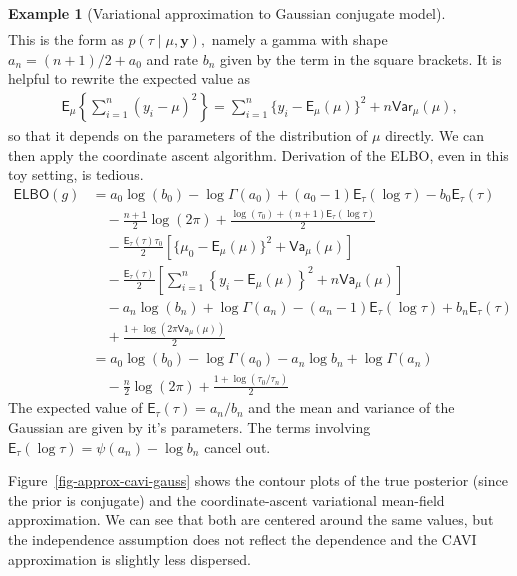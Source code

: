 \documentclass[
  11pt,
  letterpaper,
]{scrbook}
\theoremstyle{definition}
\newtheorem{example}{Example}[chapter]
\theoremstyle{plain}
\theoremstyle{plain}
\theoremstyle{plain}
\theoremstyle{definition}
\theoremstyle{definition}
\theoremstyle{plain}
\theoremstyle{plain}
\theoremstyle{remark}
\begin{document}
\begin{example}[Variational approximation to Gaussian conjugate
model]
\begin{align*}
\end{align*} This is the form as \(p(\tau \mid \mu, \boldsymbol{y}),\)
namely a gamma with shape \(a_n =(n+1)/2 + a_0\) and rate \(b_n\) given
by the term in the square brackets. It is helpful to rewrite the
expected value as \begin{align*}
 \mathsf{E}_{\mu}\left\{\sum_{i=1}^n (y_i-\mu)^2\right\} = \sum_{i=1}^n \{y_i - \mathsf{E}_{\mu}(\mu)\}^2 + n \mathsf{Var}_{\mu}(\mu),
\end{align*} so that it depends on the parameters of the distribution of
\(\mu\) directly. We can then apply the coordinate ascent algorithm.
Derivation of the ELBO, even in this toy setting, is tedious.
\begin{align*}
\mathsf{ELBO}(g) & = a_0\log(b_0)-\log \Gamma(a_0) +(a_0-1)\mathsf{E}_{\tau}(\log \tau)- b_0\mathsf{E}_{\tau}(\tau)\\
& \quad - \frac{n+1}{2} \log(2\pi) + \frac{\log(\tau_0) + (n+1)\mathsf{E}_{\tau}(\log \tau)}{2} \\&\quad - \frac{\mathsf{E}_{\tau}(\tau)\tau_0}{2} \left[\{\mu_0 - \mathsf{E}_{\mu}(\mu)\}^2 + \mathsf{Va}_{\mu}(\mu)\right]
\\&\quad - \frac{\mathsf{E}_{\tau}(\tau)}{2} \left[ \sum_{i=1}^n \left\{y_i - \mathsf{E}_{\mu}(\mu)\right\}^2 + n \mathsf{Va}_{\mu}(\mu)\right]
\\ &\quad - a_n \log (b_n) + \log \Gamma(a_n) - (a_n-1) \mathsf{E}_{\tau}(\log \tau) + b_n \mathsf{E}_{\tau}(\tau) 
\\& \quad + \frac{1 + \log(2\pi\mathsf{Va}_{\mu}(\mu))}{2}
\\&= a_0\log(b_0)-\log \Gamma(a_0) -a_n\log b_n + \log \Gamma(a_n) 
\\& \quad - \frac{n}{2}\log(2\pi)+ \frac{1 + \log (\tau_0/\tau_n)}{2} 
\end{align*} The expected value of \(\mathsf{E}_{\tau}(\tau) = a_n/b_n\)
and the mean and variance of the Gaussian are given by it's parameters.
The terms involving
\(\mathsf{E}_{\tau}(\log \tau) = \psi(a_n)-\log b_n\) cancel out.

Figure~\ref{fig-approx-cavi-gauss} shows the contour plots of the true
posterior (since the prior is conjugate) and the coordinate-ascent
variational mean-field approximation. We can see that both are centered
around the same values, but the independence assumption does not reflect
the dependence and the CAVI approximation is slightly less dispersed.

\begin{figure}[ht!]


\end{figure}
\end{example}
\end{document}
